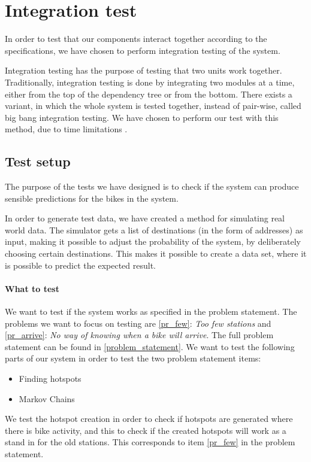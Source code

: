 \section{Integration test}

In order to test that our components interact together according to the specifications, we have chosen to perform integration testing of the system.

Integration testing has the purpose of testing that two units work together. 
Traditionally, integration testing is done by integrating two modules at a time, either from the top of the dependency tree or from the bottom.
There exists a variant, in which the whole system is tested together, instead of pair-wise, called big bang integration testing.
We have chosen to perform our test with this method, due to time limitations \cite{inttest}.

\subsection{Test setup}
The purpose of the tests we have designed is to check if the system can produce sensible predictions for the bikes in the system.

In order to generate test data, we have created a method for simulating real world data. 
The simulator gets a list of destinations (in the form of addresses) as input, making it possible to adjust the probability of the system, by deliberately choosing certain destinations.
This makes it possible to create a data set, where it is possible to predict the expected result.

\paragraph{What to test}
We want to test if the system works as specified in the problem statement.
The problems we want to focus on testing are \ref{pr_few}: \textit{Too few stations} and \ref{pr_arrive}: \textit{No way of knowing when a bike will arrive}. 
The full problem statement can be found in \cref{problem_statement}.
We want to test the following parts of our system in order to test the two problem statement items:

\begin{itemize}
\item Finding hotspots 
\item Markov Chains
\end{itemize}

We test the hotspot creation in order to check if hotspots are generated where there is bike activity, and this to check if the created hotspots will work as a stand in for the old stations.
This corresponds to item \ref{pr_few} in the problem statement.

